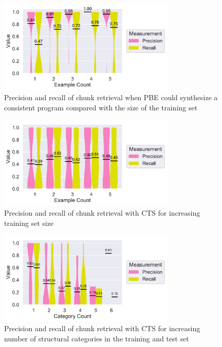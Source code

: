 \documentclass[\myrootdir/main.tex]{subfiles}
\begin{document}
\begin{figure}[htbp]
		\centering
		\includegraphics[width=0.75\textwidth, clip]{img/big-study/recall-precision-examplecount-sythesisworked-PBE.pdf}
		\caption{Precision and recall of chunk retrieval when PBE could synthesize a consistent program compared with the size of the training set}
		\label{fig:recall-precision-examplecount-sythesisworked-PBE}
\end{figure}

\begin{figure}[htbp]
		\centering
		\includegraphics[width=0.75\textwidth, clip]{img/big-study/recall-precision-examplecount-CTS.pdf}
		\caption{Precision and recall of chunk retrieval with CTS for increasing training set size}
		\label{fig:recall-precision-examplecount-CTS}
\end{figure}

\begin{figure}[htbp]
		\centering
		\includegraphics[width=0.75\textwidth, clip]{img/big-study/recall-precision-categorycount-CTS.pdf}
		\caption{Precision and recall of chunk retrieval with CTS for increasing number of structural categories in the training and test set}
		\label{fig:recall-precision-categorycount-CTS}
\end{figure}
\end{document}
